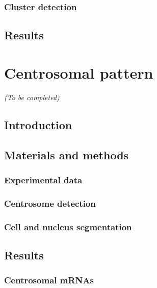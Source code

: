 \subsubsection{Cluster detection}

\subsection{Results}
\label{subsec:results_translation_factories}

\section{Centrosomal pattern}
\label{sec:centrosomal}

\begin{center}
	\textit{(To be completed)}
\end{center}

\subsection{Introduction}
\label{subsec:introduction_centrosomal}

\subsection{Materials and methods}
\label{subsec:materials_centrosomal}

\subsubsection{Experimental data}

\subsubsection{Centrosome detection}

\subsubsection{Cell and nucleus segmentation}

\subsection{Results}
\label{subsec:results_centrosomal}

\subsubsection{Centrosomal mRNAs}

